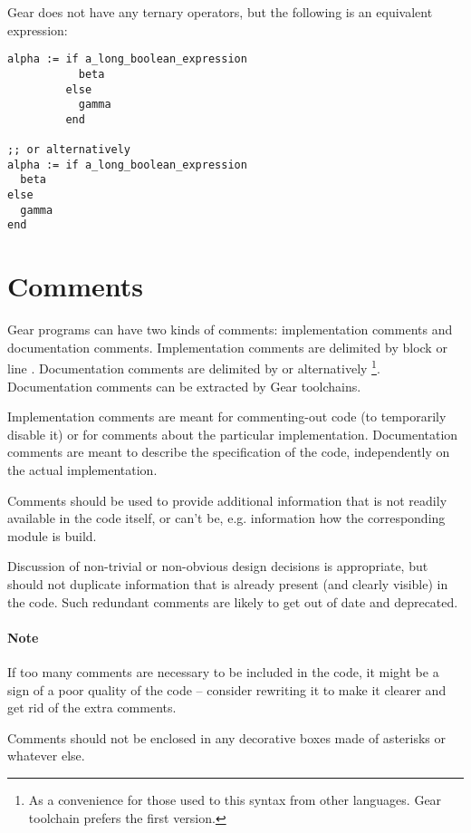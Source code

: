 \example Gear does not have any ternary operators, but the following is an equivalent expression:

\begin{lstlisting}
alpha := if a_long_boolean_expression
           beta
         else
           gamma
         end

;; or alternatively
alpha := if a_long_boolean_expression
  beta
else
  gamma
end
\end{lstlisting}





\section{Comments}

Gear programs can have two kinds of comments: implementation comments and documentation comments. Implementation comments are delimited by block \code{(* $\ \ldots$ *)} or line \code{;;}. Documentation comments are delimited by \code{(*! $\ \ldots$ *)} or alternatively \code{(** $\ \ldots$ *)}\footnote{As a convenience for those used to this syntax from other languages. Gear toolchain prefers the first version.}. Documentation comments can be extracted by Gear toolchains.

Implementation comments are meant for commenting-out code (to temporarily disable it) or for comments about the particular implementation. Documentation comments are meant to describe the specification of the code, independently on the actual implementation. 

Comments should be used to provide additional information that is not readily available in the code itself, or can't be, e.g. information how the corresponding module is build. 

Discussion of non-trivial or non-obvious design decisions is appropriate, but should not duplicate information that is already present (and clearly visible) in the code. Such redundant comments are likely to get out of date and deprecated. 

\paragraph{Note}
If too many comments are necessary to be included in the code, it might be a sign of a poor quality of the code -- consider rewriting it to make it clearer and get rid of the extra comments. 

Comments should not be enclosed in any decorative boxes made of asterisks or whatever else. 





